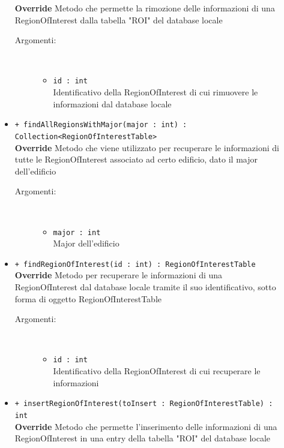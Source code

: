 \documentclass[../DefinizioneDiProdotto.tex]{subfiles}
\begin{document}
\begin{description}
\begin{itemize}
		\textbf{Override} Metodo che permette la rimozione delle informazioni di una RegionOfInterest dalla tabella "ROI" del database locale
		\begin{description}
			\item[Argomenti:] \
			\begin{itemize}
				\item \texttt{id : int}\\
				Identificativo della RegionOfInterest di cui rimuovere le informazioni dal database locale\end{itemize}
		\end{description}
		\item \texttt{+ findAllRegionsWithMajor(major : int) : Collection<RegionOfInterestTable>}\\
		\textbf{Override} Metodo che viene utilizzato per recuperare le informazioni di tutte le RegionOfInterest associato ad certo edificio, dato il major dell'edificio
		\begin{description}
			\item[Argomenti:] \
			\begin{itemize}
				\item \texttt{major : int}\\
				Major dell'edificio\end{itemize}
		\end{description}
		\item \texttt{+ findRegionOfInterest(id : int) : RegionOfInterestTable}\\
		\textbf{Override} Metodo per recuperare le informazioni di una RegionOfInterest dal database locale tramite il suo identificativo, sotto forma di oggetto RegionOfInterestTable
		\begin{description}
			\item[Argomenti:] \
			\begin{itemize}
				\item \texttt{id : int}\\
				Identificativo della RegionOfInterest di cui recuperare le informazioni\end{itemize}
		\end{description}
		\item \texttt{+ insertRegionOfInterest(toInsert : RegionOfInterestTable) : int}\\
		\textbf{Override} Metodo che permette l'inserimento delle informazioni di una RegionOfInterest in una entry della tabella "ROI" del database locale
		\begin{description}

\end{description}
\end{itemize}
\end{description}
\end{document}
